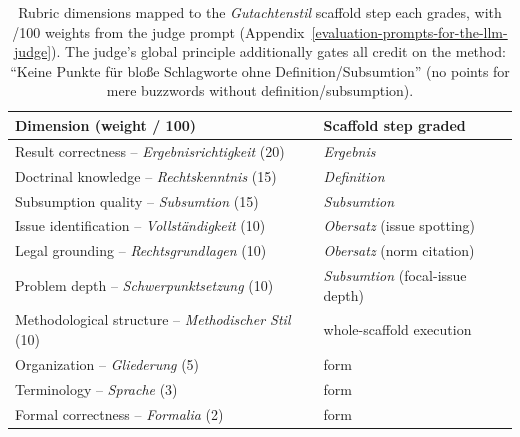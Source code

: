 \begin{table}[t]
\centering
\footnotesize
\setlength{\tabcolsep}{4pt}
\begin{tabular}{@{}p{}p{}@{}}
\toprule
\textbf{Dimension (weight / 100)} & \textbf{Scaffold step graded} \\
\midrule
Result correctness -- \emph{Ergebnisrichtigkeit} (20) & \emph{Ergebnis} \\
Doctrinal knowledge -- \emph{Rechtskenntnis} (15) & \emph{Definition} \\
Subsumption quality -- \emph{Subsumtion} (15) & \emph{Subsumtion} \\
Issue identification -- \emph{Vollständigkeit} (10) & \emph{Obersatz} (issue spotting) \\
Legal grounding -- \emph{Rechtsgrundlagen} (10) & \emph{Obersatz} (norm citation) \\
Problem depth -- \emph{Schwerpunktsetzung} (10) & \emph{Subsumtion} (focal-issue depth) \\
Methodological structure -- \emph{Methodischer Stil} (10) & whole-scaffold execution \\
Organization -- \emph{Gliederung} (5) & form \\
Terminology -- \emph{Sprache} (3) & form \\
Formal correctness -- \emph{Formalia} (2) & form \\
\bottomrule
\end{tabular}
\caption{Rubric dimensions mapped to the \emph{Gutachtenstil} scaffold step each grades, with /100 weights from the judge prompt (Appendix~\ref{evaluation-prompts-for-the-llm-judge}). The judge's global principle additionally gates all credit on the method: ``Keine Punkte für bloße Schlagworte ohne Definition/Subsumtion'' (no points for mere buzzwords without definition/subsumption).}
\label{tbl-rubric-mapping}
\end{table}
